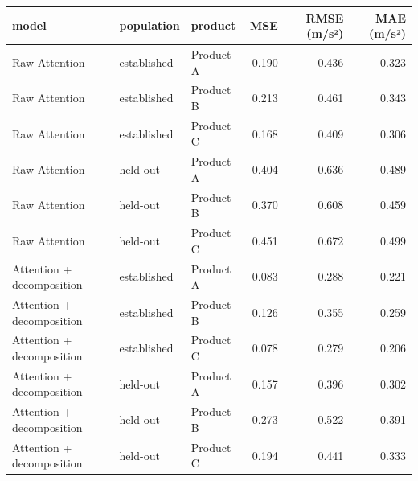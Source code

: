 \begin{tabular}{lllrrr}
\toprule
model & population & product & MSE & RMSE (m/s²) & MAE (m/s²) \\
\midrule
Raw Attention & established & Product A & 0.190 & 0.436 & 0.323 \\
Raw Attention & established & Product B & 0.213 & 0.461 & 0.343 \\
Raw Attention & established & Product C & 0.168 & 0.409 & 0.306 \\
Raw Attention & held-out & Product A & 0.404 & 0.636 & 0.489 \\
Raw Attention & held-out & Product B & 0.370 & 0.608 & 0.459 \\
Raw Attention & held-out & Product C & 0.451 & 0.672 & 0.499 \\
Attention + decomposition & established & Product A & 0.083 & 0.288 & 0.221 \\
Attention + decomposition & established & Product B & 0.126 & 0.355 & 0.259 \\
Attention + decomposition & established & Product C & 0.078 & 0.279 & 0.206 \\
Attention + decomposition & held-out & Product A & 0.157 & 0.396 & 0.302 \\
Attention + decomposition & held-out & Product B & 0.273 & 0.522 & 0.391 \\
Attention + decomposition & held-out & Product C & 0.194 & 0.441 & 0.333 \\
\bottomrule
\end{tabular}
